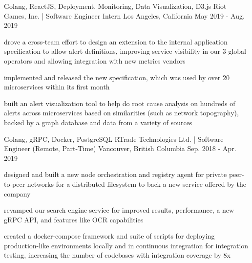 

\begin{cventries}

  \cventry
    {Golang, ReactJS, Deployment, Monitoring, Data Visualization, D3.js} %
    {Riot Games, Inc. | Software Engineer Intern} %
    {Los Angeles, California} %
    {May 2019 - Aug. 2019} %
    {
      \begin{cvitems} %
        \item {drove a cross-team effort to design an extension to the internal application specification to allow alert definitions, improving service visibility in our 3 global operators and allowing integration with new metrics vendors}
        \item{implemented and released the new specification, which was used by over 20 microservices within its first month}
        \item {built an alert visualization tool to help do root cause analysis on hundreds of alerts across microservices based on similarities (such as network topography), backed by a graph database and data from a variety of sources}
      \end{cvitems}
    }

  \cventry
    {Golang, gRPC, Docker, PostgreSQL} %
    {RTrade Technologies Ltd. | Software Engineer (Remote, Part-Time)} %
    {Vancouver, British Columbia} %
    {Sep. 2018 - Apr. 2019} %
    {
      \begin{cvitems} %
        \item {designed and built a new node orchestration and registry agent for private  peer-to-peer networks for a distributed filesystem to back a new service offered by the company}
        \item {revamped our search engine service for improved results, performance, a new gRPC API, and features like OCR capabilities}
        \item {created a docker-compose framework and suite of scripts for deploying production-like environments locally and in continuous integration for integration testing, increasing the number of codebases with integration coverage by 8x}
      \end{cvitems}
    }


\end{cventries}
